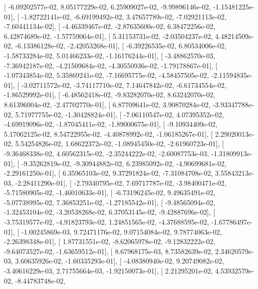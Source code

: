 \documentclass{article}
\begin{document}
       [ -6.09202577e-02,   8.05177229e-02,   6.25909027e-02,
         -9.99896146e-02,  -1.15481225e-01],
       [ -1.82722141e-02,  -6.69199492e-02,   3.47657789e-02,
         -7.02921113e-02,  -7.60441134e-02],
       [ -4.46339467e-02,  -2.87635600e-02,   6.38472256e-02,
          6.42874689e-02,  -1.57759064e-01],
       [  5.31153731e-02,  -2.03504237e-02,   4.48214509e-02,
         -6.13386128e-02,  -2.42053268e-01],
       [ -6.39226535e-02,   6.80534006e-02,  -1.58733284e-02,
          5.01466233e-02,  -1.16176244e-01],
       [ -3.48862570e-03,  -7.36942187e-02,  -4.21509684e-02,
         -4.30550936e-02,  -1.79178867e-01],
       [ -1.07343854e-02,   5.35869241e-02,  -7.16695775e-02,
         -4.58457505e-02,  -2.11594835e-01],
       [ -3.02711572e-02,  -3.74117710e-02,   7.14647842e-02,
         -6.61734554e-02,  -1.86529992e-01],
       [ -6.48562418e-02,  -9.83282070e-02,   8.63242070e-02,
          8.61396004e-02,  -2.47702770e-01],
       [  6.87709641e-02,   3.90870284e-02,  -3.93347788e-02,
          5.71977755e-02,  -1.30428824e-01],
       [ -7.06110547e-02,   4.07395352e-02,  -4.69919096e-02,
         -1.87045411e-02,  -1.89000675e-01],
       [ -9.10934409e-02,   5.17062125e-02,   8.54722955e-02,
         -4.40878992e-02,  -1.06185267e-01],
       [  2.29020013e-02,   5.54254826e-02,   1.68622372e-02,
         -1.08945450e-02,  -2.61960723e-01],
       [ -9.36468338e-02,   4.60562315e-02,  -2.35244222e-02,
         -2.60087753e-03,  -1.31809913e-01],
       [ -9.35262819e-02,  -9.30944882e-02,   6.23985092e-02,
         -4.90699681e-02,  -2.29161250e-01],
       [  6.35965103e-02,   9.37291824e-02,  -7.31084708e-02,
          3.55843213e-03,  -2.28411290e-01],
       [ -2.79340795e-02,   7.69717787e-02,  -3.98400471e-02,
         -5.71580905e-02,  -1.46010633e-01],
       [ -6.73196245e-02,   9.49635491e-02,  -5.07738995e-02,
          7.36853251e-02,  -1.27185542e-01],
       [ -9.48565094e-02,  -1.32453104e-02,  -3.20538268e-02,
          6.37053145e-02,  -9.42887696e-02],
       [ -3.75319577e-02,  -4.91823793e-02,   1.24851565e-02,
         -4.37688595e-02,  -1.67786497e-01],
       [ -1.00245869e-03,   9.72471176e-02,   9.07154084e-02,
          9.78774063e-02,  -2.26398348e-01],
       [  1.87731551e-02,  -8.62065978e-02,  -9.12832222e-02,
         -9.64073527e-02,  -1.63659512e-01],
       [  8.67968175e-03,   8.73582639e-02,   2.34620579e-03,
          3.60635926e-02,  -1.60335293e-01],
       [ -4.08380940e-02,   9.20749082e-02,  -3.40616229e-03,
          2.71755664e-03,  -1.92150073e-01],
       [  2.21295201e-02,   4.53932579e-02,  -8.44783748e-02,
\end{document}
